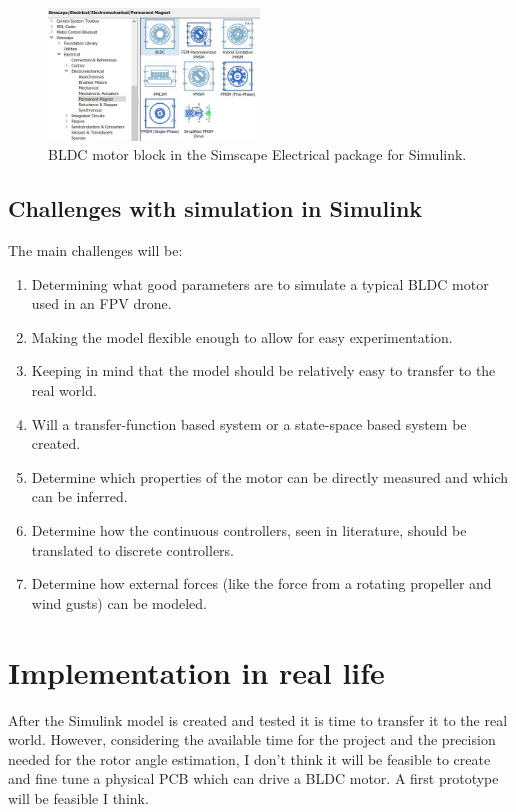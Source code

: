 \documentclass[]{report}
\begin{document}
\begin{figure}[H]
	\includegraphics[width=0.5\textwidth]{SimscapeElectricalBldcBlock.JPG}
	\caption{BLDC motor block in the Simscape Electrical package for Simulink.}
	\label{fig:SimscapeElectricalBldcBlock}
\end{figure}

\subsection{Challenges with simulation in Simulink}
The main challenges will be:
\begin{enumerate}
	\item Determining what good parameters are to simulate a typical BLDC motor used in an FPV drone.
	\item Making the model flexible enough to allow for easy experimentation.
	\item Keeping in mind that the model should be relatively easy to transfer to the real world.
	\item Will a transfer-function based system or a state-space based system be created.
	\item Determine which properties of the motor can be directly measured and which can be inferred.
	\item Determine how the continuous controllers, seen in literature, should be translated to discrete controllers.
	\item Determine how external forces (like the force from a rotating propeller and wind gusts) can be modeled.
\end{enumerate}

\section{Implementation in real life}
After the Simulink model is created and tested it is time to transfer it to the real world. However, considering the available time for the project and the precision needed for the rotor angle estimation, I don't think it will be feasible to create and fine tune a physical PCB which can drive a BLDC motor. A first prototype will be feasible I think.
\end{document}
